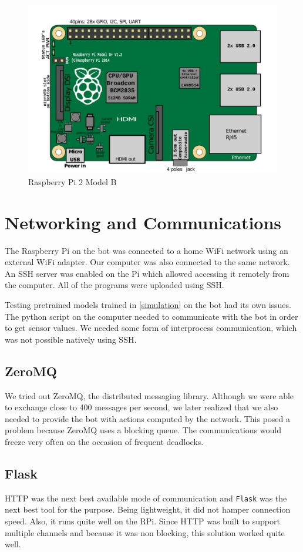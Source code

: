 \documentclass[12pt]{extreport}
\theoremstyle{plain}
\theoremstyle{definition}
\begin{document}
\begin{figure}[h]
    \centering
    \includegraphics{rpi}
    \caption{Raspberry Pi 2 Model B}
\end{figure}

\section{Networking and Communications}
The Raspberry Pi on the bot was connected to a home WiFi network using an external WiFi adapter. Our computer was also connected to the same network.
An SSH server was enabled on the Pi which allowed accessing it remotely from the computer. All of the programs were uploaded using SSH.

Testing pretrained models trained in \autoref{simulation} on the bot had its own issues. The python script on the computer needed to communicate with the bot in order to get sensor values. We needed some form of interprocess communication, which was not possible natively using SSH.

\subsection{ZeroMQ}
We tried out ZeroMQ, the distributed messaging library. Although we were able to exchange close to 400 messages per second, we later realized that we also needed to provide the bot with actions computed by the network. This posed a problem because ZeroMQ uses a blocking queue. The communications would freeze very often on the occasion of frequent deadlocks.

\subsection{Flask}
HTTP was the next best available mode of communication and \texttt{Flask} was the next best tool for the purpose. Being lightweight, it did not hamper connection speed. Also, it runs quite well on the RPi. Since HTTP was built to support multiple channels and because it was non blocking, this solution worked quite well.
\end{document}
